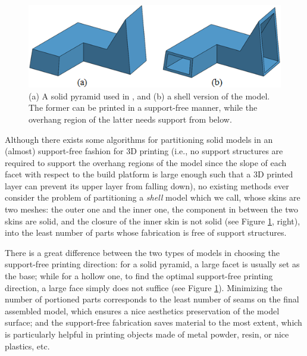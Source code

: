 \begin{figure}[t!]
  \centering
  \includegraphics[width=\linewidth]{figs/solid_hollow.png}
  \caption{\label{fig:solid_hollow}%
  (a) A solid pyramid used in \cite{Hu_siga14}, and (b) a shell version of the model. The former can be printed in a support-free manner, while {\color{blue}the overhang region} of the latter needs support from below.}
\end{figure}

{{Although there exists some algorithms for partitioning solid models in an (almost) support-free fashion \cite{Hu_siga14} for 3D printing ({\color{blue}i.e., no support structures are required to support the overhang regions of the model since the slope of each facet with respect to the build platform is large enough such that a 3D printed layer can prevent its upper layer from falling down}), no existing methods ever consider the problem of partitioning a \emph{shell} model which we call, {\color{blue} whose skins are two meshes: the outer one and the inner one, the component in between the two skins are solid, and the closure of the inner skin is not solid (see Figure \ref{fig:solid_hollow}, right),} into the least number of parts whose fabrication is free of support structures. 



There is a great difference between the two types of models in choosing the support-free printing direction: for a solid pyramid, a large facet is usually set as the base; while for a hollow one, to find the optimal support-free printing direction, a large face simply does not suffice (see Figure \ref{fig:solid_hollow}). Minimizing the number of portioned parts corresponds to the least number of seams on the final assembled model, which ensures a nice aesthetics preservation of the model surface; and the support-free fabrication saves material to the most extent, which is particularly helpful in printing objects made of metal powder, resin, or nice plastics, etc.}}



